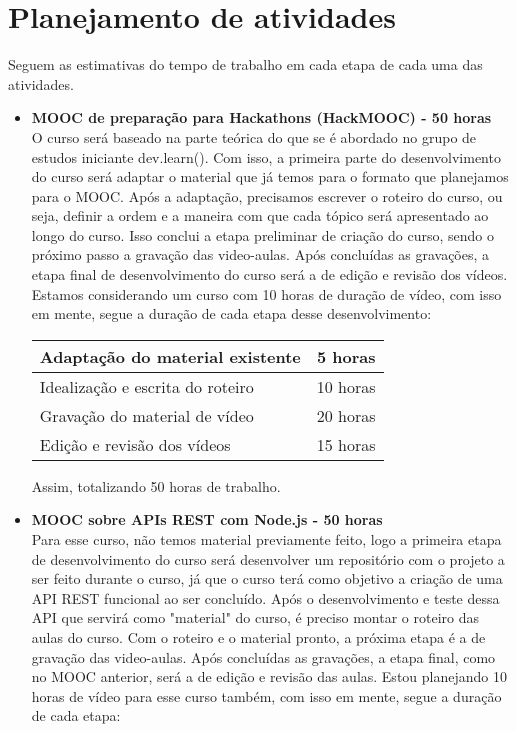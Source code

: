 \documentclass[10pt,twoside,a4paper]{article}
\begin{document}
\section{Planejamento de atividades}
  
  Seguem as estimativas do tempo de trabalho em cada etapa de cada uma das atividades.

  \begin{itemize}
    \item \textbf{MOOC de preparação para Hackathons (HackMOOC) - 50 horas} \\
        O curso será baseado na parte teórica do que se é abordado no grupo de estudos iniciante dev.learn(). Com isso, a primeira parte do desenvolvimento do curso será adaptar o material que já temos para o formato que planejamos para o MOOC. Após a adaptação, precisamos escrever o roteiro do curso, ou seja, definir a ordem e a maneira com que cada tópico será apresentado ao longo do curso. Isso conclui a etapa preliminar de criação do curso, sendo o próximo passo a gravação das video-aulas. Após concluídas as gravações, a etapa final de desenvolvimento do curso será a de edição e revisão dos vídeos. Estamos considerando um curso com 10 horas de duração de vídeo, com isso em mente, segue a duração de cada etapa desse desenvolvimento:
        
        \begin{center}
            \begin{tabular}{ |l|c| } 
                \hline
                     Adaptação do material existente & 5 horas \\
                     \hline
                     Idealização e escrita do roteiro & 10 horas \\
                     \hline
                     Gravação do material de vídeo & 20 horas \\
                     \hline
                     Edição e revisão dos vídeos & 15 horas \\
                \hline
            \end{tabular}
        \end{center}
        
        Assim, totalizando 50 horas de trabalho.
    
    \item \textbf{MOOC sobre APIs REST com Node.js - 50 horas} \\
        Para esse curso, não temos material previamente feito, logo a primeira etapa de desenvolvimento do curso será desenvolver um repositório com o projeto a ser feito durante o curso, já que o curso terá como objetivo a criação de uma API REST funcional ao ser concluído. Após o desenvolvimento e teste dessa API que servirá como "material" do curso, é preciso montar o roteiro das aulas do curso. Com o roteiro e o material pronto, a próxima etapa é a de gravação das video-aulas. Após concluídas as gravações, a etapa final, como no MOOC anterior, será a de edição e revisão das aulas. Estou planejando 10 horas de vídeo para esse curso também, com isso em mente, segue a duração de cada etapa:
        

\end{itemize}
\end{document}
